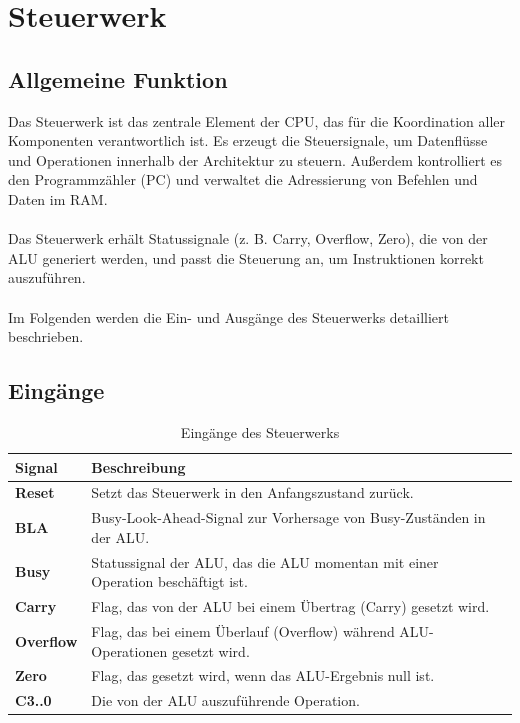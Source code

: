 \chapter{Steuerwerk}
\label{chap:Steuerwerk}

\section{Allgemeine Funktion}

Das Steuerwerk ist das zentrale Element der CPU, das für die Koordination aller Komponenten verantwortlich ist.
Es erzeugt die Steuersignale, um Datenflüsse und Operationen innerhalb der Architektur zu steuern.
Außerdem kontrolliert es den Programmzähler (PC) und verwaltet die Adressierung von Befehlen und Daten im RAM.
\\\\
Das Steuerwerk erhält Statussignale (z. B. Carry, Overflow, Zero), die von der ALU generiert werden, und
passt die Steuerung an, um Instruktionen korrekt auszuführen.
\\\\
Im Folgenden werden die Ein- und Ausgänge des Steuerwerks detailliert beschrieben.

\section{Eingänge}
\begin{table}[H]
    \centering
    \begin{tabular}{|l|p{10cm}|}
        \hline
        \textbf{Signal}   & \textbf{Beschreibung}                                                           \\ \hline
        \textbf{Reset}    & Setzt das Steuerwerk in den Anfangszustand zurück.                              \\ \hline
        \textbf{BLA}      & Busy-Look-Ahead-Signal zur Vorhersage von Busy-Zuständen in der ALU.            \\ \hline
        \textbf{Busy}     & Statussignal der ALU, das die ALU momentan mit einer Operation beschäftigt ist. \\ \hline
        \textbf{Carry}    & Flag, das von der ALU bei einem Übertrag (Carry) gesetzt wird.                  \\ \hline
        \textbf{Overflow} & Flag, das bei einem Überlauf (Overflow) während ALU-Operationen gesetzt wird.   \\ \hline
        \textbf{Zero}     & Flag, das gesetzt wird, wenn das ALU-Ergebnis null ist.                         \\ \hline
        \textbf{C3..0}    & Die von der ALU auszuführende Operation.                                        \\ \hline
    \end{tabular}
    \caption{Eingänge des Steuerwerks}
\end{table}

